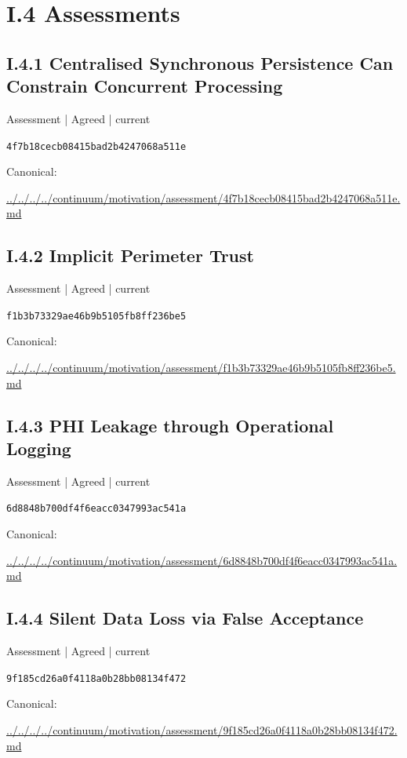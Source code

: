 \documentclass[10pt,a4paper]{article}
\begin{document}
\section*{I.4 Assessments}
\subsection*{I.4.1 Centralised Synchronous Persistence Can Constrain Concurrent Processing}
\label{element-4f7b18cecb08415bad2b4247068a511e}
{\small Assessment | Agreed | current}\par
\texttt{4f7b18cecb08415bad2b4247068a511e}\par
Canonical: \par
{\footnotesize\url{../../../../continuum/motivation/assessment/4f7b18cecb08415bad2b4247068a511e.md}}\par
\subsection*{I.4.2 Implicit Perimeter Trust}
\label{element-f1b3b73329ae46b9b5105fb8ff236be5}
{\small Assessment | Agreed | current}\par
\texttt{f1b3b73329ae46b9b5105fb8ff236be5}\par
Canonical: \par
{\footnotesize\url{../../../../continuum/motivation/assessment/f1b3b73329ae46b9b5105fb8ff236be5.md}}\par
\subsection*{I.4.3 PHI Leakage through Operational Logging}
\label{element-6d8848b700df4f6eacc0347993ac541a}
{\small Assessment | Agreed | current}\par
\texttt{6d8848b700df4f6eacc0347993ac541a}\par
Canonical: \par
{\footnotesize\url{../../../../continuum/motivation/assessment/6d8848b700df4f6eacc0347993ac541a.md}}\par
\subsection*{I.4.4 Silent Data Loss via False Acceptance}
\label{element-9f185cd26a0f4118a0b28bb08134f472}
{\small Assessment | Agreed | current}\par
\texttt{9f185cd26a0f4118a0b28bb08134f472}\par
Canonical: \par
{\footnotesize\url{../../../../continuum/motivation/assessment/9f185cd26a0f4118a0b28bb08134f472.md}}\par
\end{document}
